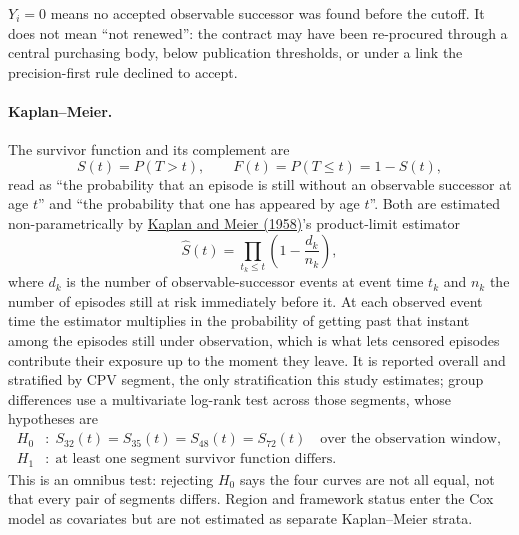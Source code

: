 \documentclass[11pt,a4paper]{article}
\begin{document}
\(Y_i=0\) means no accepted observable successor was found before the cutoff.
It does not mean ``not renewed'': the contract may have been re-procured through
a central purchasing body, below publication thresholds, or under a link the
precision-first rule declined to accept.

\paragraph{Kaplan--Meier.} The survivor function and its complement are
\[
S(t)=P(T>t),
\qquad
F(t)=P(T\le t)=1-S(t) ,
\]
read as ``the probability that an episode is still without an observable
successor at age \(t\)'' and ``the probability that one has appeared by age
\(t\)''. Both are estimated non-parametrically by
\href{https://doi.org/10.1080/01621459.1958.10501452}{Kaplan and Meier
(1958)}'s product-limit estimator
\[
\hat{S}(t)=\prod_{t_k\le t}\left(1-\frac{d_k}{n_k}\right),
\]
where \(d_k\) is the number of observable-successor events at event time
\(t_k\) and \(n_k\) the number of episodes still at risk immediately before it.
At each observed event time the estimator multiplies in the probability of
getting past that instant among the episodes still under observation, which is
what lets censored episodes contribute their exposure up to the moment they
leave. It is reported overall and stratified by CPV segment, the only
stratification this study estimates; group differences use a multivariate
log-rank test across those segments, whose hypotheses are
\[
\begin{aligned}
H_0&:\; S_{32}(t)=S_{35}(t)=S_{48}(t)=S_{72}(t)
\quad\text{over the observation window},\\
H_1&:\;\text{at least one segment survivor function differs}.
\end{aligned}
\]
This is an omnibus test: rejecting \(H_0\) says the four curves are not all
equal, not that every pair of segments differs. Region and framework status
enter the Cox model as covariates but are not estimated as separate
Kaplan--Meier strata.
\end{document}
